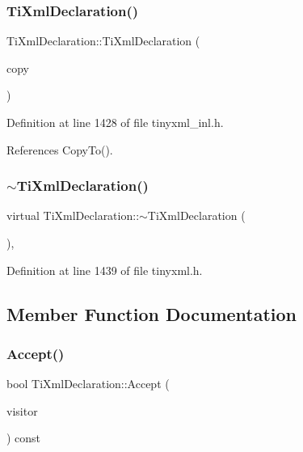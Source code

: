 \subsubsection{\texorpdfstring{Ti\+Xml\+Declaration()}{TiXmlDeclaration()}\hspace{0.1cm}{\footnotesize\ttfamily [4/4]}}
{\footnotesize\ttfamily Ti\+Xml\+Declaration\+::\+Ti\+Xml\+Declaration (\begin{DoxyParamCaption}\item[{const \hyperlink{class_ti_xml_declaration}{Ti\+Xml\+Declaration} \&}]{copy }\end{DoxyParamCaption})}



Definition at line 1428 of file tinyxml\+\_\+inl.\+h.



References Copy\+To().

\hypertarget{class_ti_xml_declaration_ad5f37a673f4c507fd7e550470f9cec25}{}\label{class_ti_xml_declaration_ad5f37a673f4c507fd7e550470f9cec25} 
\subsubsection{\texorpdfstring{$\sim$\+Ti\+Xml\+Declaration()}{~TiXmlDeclaration()}}
{\footnotesize\ttfamily virtual Ti\+Xml\+Declaration\+::$\sim$\+Ti\+Xml\+Declaration (\begin{DoxyParamCaption}{ }\end{DoxyParamCaption})\hspace{0.3cm}{\ttfamily [inline]}, {\ttfamily [virtual]}}



Definition at line 1439 of file tinyxml.\+h.



\subsection{Member Function Documentation}
\hypertarget{class_ti_xml_declaration_aa1b6bade6c989407ce9881bdfc73c1e6}{}\label{class_ti_xml_declaration_aa1b6bade6c989407ce9881bdfc73c1e6} 
\subsubsection{\texorpdfstring{Accept()}{Accept()}}
{\footnotesize\ttfamily bool Ti\+Xml\+Declaration\+::\+Accept (\begin{DoxyParamCaption}\item[{\hyperlink{class_ti_xml_visitor}{Ti\+Xml\+Visitor} $\ast$}]{visitor }\end{DoxyParamCaption}) const\hspace{0.3cm}{\ttfamily [virtual]}}

